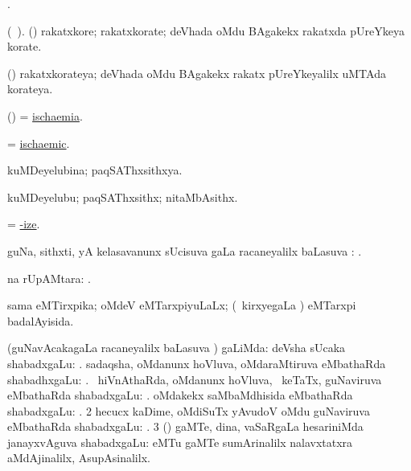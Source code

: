 \bentry
{}
\gl{\saMkiSx}
\bmng
{}. 
\emng
\eentry

\bentry
{}
\gl{\nA}
\bmng
(\ame\ ). (\veYshA) rakatxkore; rakatxkorate; deVhada oMdu BAgakekx rakatxda pUreYkeya korate. 
\emng
\eentry

\bentry
{}
\gl{\gu}
\bmng
(\veYshA) rakatxkorateya; deVhada oMdu BAgakekx rakatx pUreYkeyalilx uMTAda korateya. 
\emng
\eentry

\bentry
{}
\gl{\nA}
\bmng
(\ame) =  \hyperlink{ischaemia}{ischaemia}. 
\emng
\eentry

\bentry
{}
\gl{\gu}
\bmng
 =  \hyperlink{ischaemic}{ischaemic}. 
\emng
\eentry

\bentry
{}
\gl{\gu}
\bmng
kuMDeyelubina; paqSAThxsithxya. 
\emng
\eentry

\bentry
{}
\gl{\nA}
\bmng
kuMDeyelubu; paqSAThxsithx; nitaMbAsithx. 
\emng
\eentry

\bentry
{}
\gl{\uparx}
\bmng
=  \hyperlink{hyp-ize}{-ize}. 
\emng
\eentry

\bentry
{}
\gl{\uparx}
\bmng
guNa, sithxti, yA kelasavanunx sUcisuva \nA gaLa racaneyalilx baLasuva \uparx: . 
\emng
\eentry

\bentry
{}
\gl{\uparx}
\bmng
{}na rUpAMtara: . 
\emng
\eentry

\bentry
{}
\gl{\gu}
\bmng
sama eMTirxpika; oMdeV eMTarxpiyuLaLx; (\kanmu\ kirxyegaLa \vi) eMTarxpi badalAyisida. 
\emng
\eentry

\bentry
{}
\gl{\uparx}
\bmng
(guNavAcakagaLa racaneyalilx baLasuva \uparx) 
\bnum
{} \nA gaLiMda: 
\banum
{} deVsha sUcaka shabadxgaLu: . 
 sadaqsha, oMdanunx hoVluva, oMdaraMtiruva eMbathaRda shabadhxgaLu: . 
 \kanmu\ hiVnAthaRda, oMdanunx hoVluva, \kanmu\ keTaTx, guNaviruva eMbathaRda shabadxgaLu: . 
 oMdakekx saMbaMdhisida eMbathaRda shabadxgaLu: . 
\eanum
\numie
\num{2} hecucx kaDime, oMdiSuTx yAvudoV oMdu guNaviruva eMbathaRda shabadxgaLu: . 
\num{3} (\AmA) gaMTe, dina, vaSaRgaLa hesariniMda janayxvAguva shabadxgaLu:  eMTu gaMTe sumArinalilx  nalavxtatxra aMdAjinalilx, AsupAsinalilx. 
\enum
\emng
\eentry

